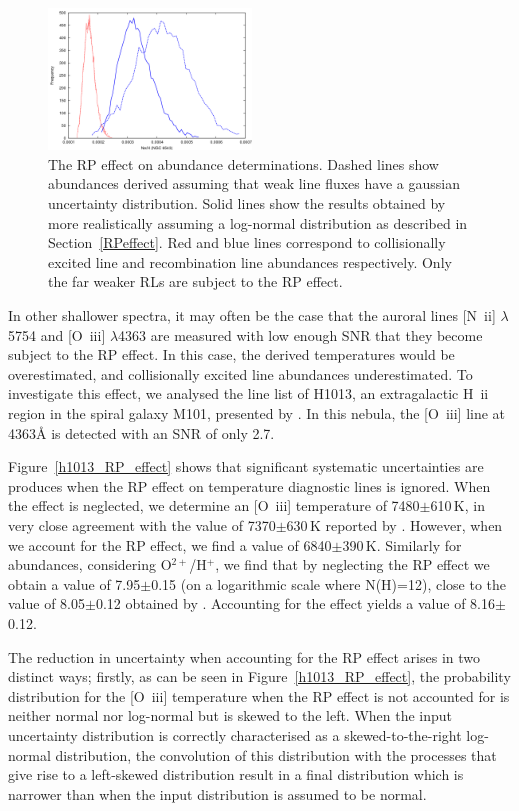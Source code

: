 \documentclass[useAMS,usenatbib]{mn2e}
\begin{document}
\begin{figure}
\includegraphics[width=0.48\textwidth]{figures/ngc6543_ne_rpeffect_simpler.png}
\caption{The RP effect on abundance determinations.  Dashed lines show abundances derived assuming that weak line fluxes have a gaussian uncertainty distribution.  Solid lines show the results obtained by more realistically assuming a log-normal distribution as described in Section~\ref{RPeffect}.  Red and blue lines correspond to collisionally excited line and recombination line abundances respectively.  Only the far weaker RLs are subject to the RP effect.}
\label{RP_figures}
\end{figure}

In other shallower spectra, it may often be the case that the auroral lines [N~{\sc ii}] $\lambda$5754 and [O~{\sc iii}] $\lambda$4363 are measured with low enough SNR that they become subject to the RP effect.  In this case, the derived temperatures would be overestimated, and collisionally excited line abundances underestimated.  To investigate this effect, we analysed the line list of H1013, an extragalactic H~{\sc ii} region in the spiral galaxy M101, presented by \citet{2009ApJ...700..654E}.  In this nebula, the [O~{\sc iii}] line at 4363{\AA} is detected with an SNR of only 2.7.

Figure~\ref{h1013_RP_effect} shows that significant systematic uncertainties are produces when the RP effect on temperature diagnostic lines is ignored.  When the effect is neglected, we determine an [O~{\sc iii}] temperature of 7480$\pm$610\,K, in very close agreement with the value of 7370$\pm$630\,K reported by \citet{2009ApJ...700..654E}.  However, when we account for the RP effect, we find a value of 6840$\pm$390\,K.  Similarly for abundances, considering O$^{2+}$/H$^+$, we find that by neglecting the RP effect we obtain a value of 7.95$\pm$0.15 (on a logarithmic scale where N(H)=12), close to the value of 8.05$\pm$0.12 obtained by \citet{2009ApJ...700..654E}.  Accounting for the effect yields a value of 8.16$\pm$0.12.

The reduction in uncertainty when accounting for the RP effect arises in two distinct ways; firstly, as can be seen in Figure~\ref{h1013_RP_effect}, the probability distribution for the [O~{\sc iii}] temperature when the RP effect is not accounted for is neither normal nor log-normal but is skewed to the left.  When the input uncertainty distribution is correctly characterised as a skewed-to-the-right log-normal distribution, the convolution of this distribution with the processes that give rise to a left-skewed distribution result in a final distribution which is narrower than when the input distribution is assumed to be normal.
\end{document}
